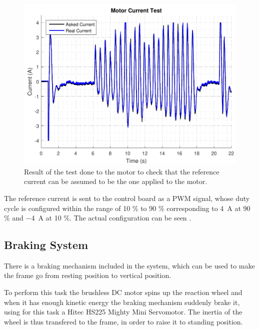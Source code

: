 \begin{figure}[H]
	\includegraphics[scale=.65]{figures/motorCurrentTest}
	\centering
	\caption{Result of the test done to the motor to check that the reference current can be assumed to be the one applied to the motor.}
	\label{motorCurrentTest2}
\end{figure}\vspace{-18pt}

The reference current is sent to the control board as a PWM signal, whose duty cycle is configured within the range of 10 \% to 90 \% corresponding to \SI{4}{A} at 90 \% and \SI{-4}{A} at 10 \%. The actual configuration can be seen .

\subsection{Braking System}
There is a braking mechanism included in the system, which can be used to make the frame go from resting position to vertical position.

To perform this task the brushless DC motor spins up the reaction wheel and when it has enough kinetic energy the braking mechanism suddenly brake it, using for this task a Hitec HS225 Mighty Mini Servomotor. The inertia of the wheel is thus transfered to the frame, in order to raise it to standing position.


